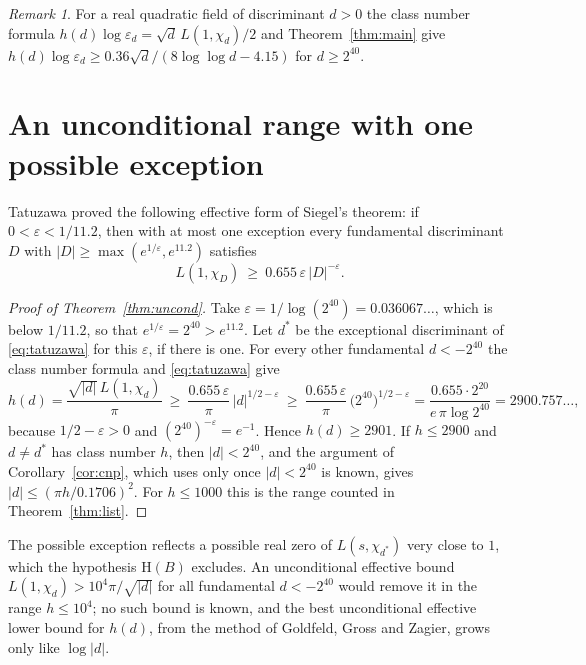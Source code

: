 \documentclass[11pt]{amsart}
\theoremstyle{definition}
\theoremstyle{remark}
\newtheorem{remark}[theorem]{Remark}
\begin{document}
\begin{remark}\label{rem:real}
For a real quadratic field of discriminant $d>0$ the class number formula $h(d)\log\varepsilon_d=\sqrt d\,L(1,\chi_d)/2$ and Theorem~\ref{thm:main} give $h(d)\log\varepsilon_d\ge0.36\sqrt d/(8\log\log d-4.15)$ for $d\ge2^{40}$.
\end{remark}

\section{An unconditional range with one possible exception}\label{sec:uncond}

Tatuzawa \cite[Lemma~9 and Theorem~2]{Tat51} proved the following effective form of Siegel's theorem: if $0<\varepsilon<1/11.2$, then with at most one exception every fundamental discriminant $D$ with $|D|\ge\max(e^{1/\varepsilon},e^{11.2})$ satisfies
\begin{equation}\label{eq:tatuzawa}
L(1,\chi_D)\ \ge\ 0.655\,\varepsilon\,|D|^{-\varepsilon}.
\end{equation}

\begin{proof}[Proof of Theorem~\ref{thm:uncond}]
Take $\varepsilon=1/\log(2^{40})=0.036067\ldots$, which is below $1/11.2$, so that $e^{1/\varepsilon}=2^{40}>e^{11.2}$. Let $d^*$ be the exceptional discriminant of \eqref{eq:tatuzawa} for this $\varepsilon$, if there is one. For every other fundamental $d<-2^{40}$ the class number formula and \eqref{eq:tatuzawa} give
\[
h(d)=\frac{\sqrt{|d|}\,L(1,\chi_d)}{\pi}\ \ge\ \frac{0.655\,\varepsilon}{\pi}\,|d|^{1/2-\varepsilon}\ \ge\ \frac{0.655\,\varepsilon}{\pi}\,\bigl(2^{40}\bigr)^{1/2-\varepsilon}=\frac{0.655\cdot2^{20}}{e\,\pi\log 2^{40}}=2900.757\ldots,
\]
because $1/2-\varepsilon>0$ and $(2^{40})^{-\varepsilon}=e^{-1}$. Hence $h(d)\ge2901$. If $h\le2900$ and $d\ne d^*$ has class number $h$, then $|d|<2^{40}$, and the argument of Corollary~\ref{cor:cnp}, which uses only \cite{MJ16} once $|d|<2^{40}$ is known, gives $|d|\le(\pi h/0.1706)^2$. For $h\le1000$ this is the range counted in Theorem~\ref{thm:list}.
\end{proof}

The possible exception reflects a possible real zero of $L(s,\chi_{d^*})$ very close to $1$, which the hypothesis $\mathrm H(B)$ excludes. An unconditional effective bound $L(1,\chi_d)>10^4\pi/\sqrt{|d|}$ for all fundamental $d<-2^{40}$ would remove it in the range $h\le10^4$; no such bound is known, and the best unconditional effective lower bound for $h(d)$, from the method of Goldfeld, Gross and Zagier, grows only like $\log|d|$.
\end{document}
